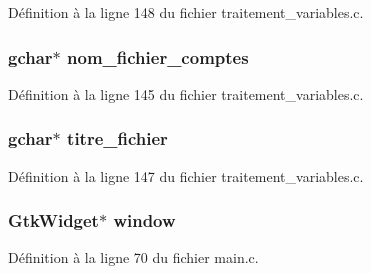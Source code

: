 Définition à la ligne 148 du fichier traitement\_\-variables.c.

\subsubsection[{nom\_\-fichier\_\-comptes}]{\setlength{\rightskip}{0pt plus 5cm}gchar$\ast$ {\bf nom\_\-fichier\_\-comptes}}\label{gsb__assistant__file_8c_ae00b9af94c75169e6ab8cf0ec25e8b89}


Définition à la ligne 145 du fichier traitement\_\-variables.c.

\subsubsection[{titre\_\-fichier}]{\setlength{\rightskip}{0pt plus 5cm}gchar$\ast$ {\bf titre\_\-fichier}}\label{gsb__assistant__file_8c_a787cc81cf2ad728775b73d723713980b}


Définition à la ligne 147 du fichier traitement\_\-variables.c.

\subsubsection[{window}]{\setlength{\rightskip}{0pt plus 5cm}GtkWidget$\ast$ {\bf window}}\label{gsb__assistant__file_8c_a3d346c08cf2d67c388caabffb412b293}


Définition à la ligne 70 du fichier main.c.

